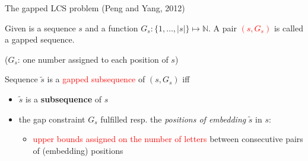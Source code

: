 \documentclass{beamer}
\begin{document}
\begin{frame}{The gapped LCS problem (Peng and Yang, 2012)}
   \begin{definition}
       Given is a sequence $s$ and a function 
       $G_s \colon \{1, \ldots, |s|\} \mapsto \mathbb{N}$. A pair \textcolor{red}{$(s, G_s)$} is called a {gapped sequence}.
   \end{definition} ($G_s$: one number assigned  to each position of $s$) \vspace{0.5cm}
   
   \begin{definition}
         Sequence $\tilde{s}$ is a \textcolor{red}{gapped subsequence} of $(s, G_s)$ iff 
         \begin{itemize}
             \item $\tilde{s}$ is a \textbf{subsequence} of $s$
             \item the gap constraint $G_s$ fulfilled resp. the \textit{positions of embedding} $\tilde{s}$ in $s$:
         \begin{itemize}
         	\item \textcolor{red}{upper bounds assigned on the number of letters} between  consecutive pairs of (embedding) positions
         \end{itemize}
       \end{itemize}
   \end{definition}
   
\end{frame}
\end{document}
